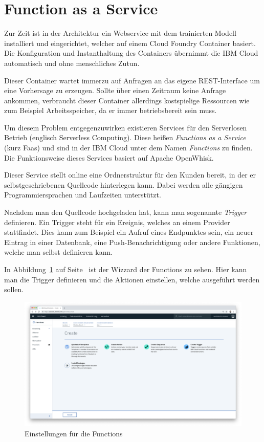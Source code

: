\section{Function as a Service}
Zur Zeit ist in der Architektur ein Webservice mit dem trainierten Modell installiert und eingerichtet, welcher auf
einem Cloud Foundry Container basiert. Die Konfiguration und Instanthaltung des Containers übernimmt die IBM Cloud
automatisch und ohne menschliches Zutun.

Dieser Container wartet immerzu auf Anfragen an das eigene REST-Interface um eine Vorhersage zu erzeugen. Sollte über
einen Zeitraum keine Anfrage ankommen, verbraucht dieser Container allerdings kostspielige Ressourcen wie zum Beispiel
Arbeitsspeicher, da er immer betriebsbereit sein muss.

Um diesem Problem entgegenzuwirken existieren Services für den Serverlosen Betrieb (englisch Serverless Computing).
Diese heißen \textit{Functions as a Service} (kurz Faas) und sind in der IBM Cloud unter dem Namen \textit{Functions}
zu finden. Die Funktionsweise dieses Services basiert auf Apache OpenWhisk.

Dieser Service stellt online eine Ordnerstruktur für den Kunden bereit, in der er selbstgeschriebenen Quellcode
hinterlegen kann. Dabei werden alle gängigen Programmiersprachen und Laufzeiten unterstützt.

Nachdem man den Quellcode hochgeladen hat, kann man sogenannte \textit{Trigger} definieren. Ein Trigger steht für ein
Ereignis, welches an einem Provider stattfindet. Dies kann zum Beispiel ein Aufruf eines Endpunktes sein, ein neuer
Eintrag in einer Datenbank, eine Push-Benachrichtigung oder andere Funktionen, welche man selbst definieren kann.

In Abbildung~\ref{fig:ausblick_functions} auf Seite~\pageref{fig:ausblick_functions} ist der Wizzard der Functions zu
sehen. Hier kann man die Trigger definieren und die Aktionen einstellen, welche ausgeführt werden sollen.

\begin{figure}[h]
    \centering
    \includegraphics[width=\textwidth]{images/kapitel_6/functions_wizzard.png}
    \caption{Einstellungen für die Functions}
    \label{fig:ausblick_functions}
\end{figure}

